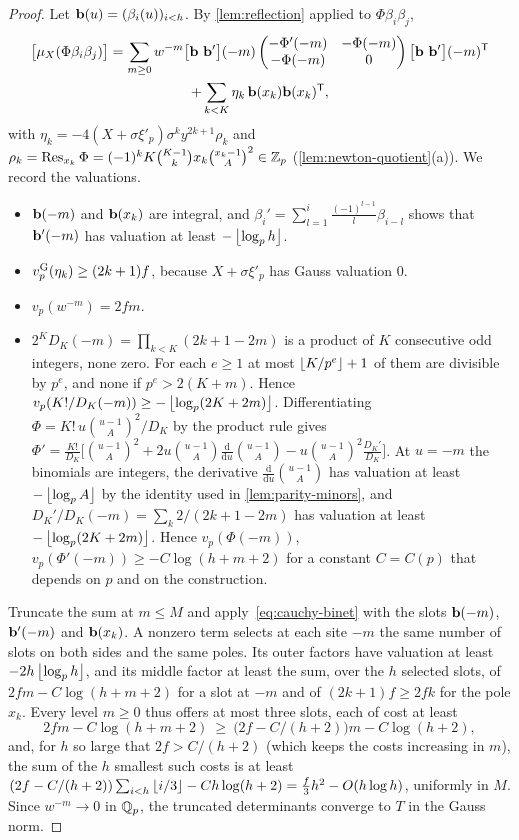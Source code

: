 \begin{proof}
Let $\mathbf{b}(u)=(\beta_i(u))_{i<h}$. By \cref{lem:reflection} applied to $\Phi\beta_i\beta_j$,
\begin{multline*}
  \bigl[\mu_X(\Phi\beta_i\beta_j)\bigr]=\sum_{m\ge0}w^{-m}\bigl[\bvec\ \bvec'\bigr](-m)
  \begin{pmatrix}-\Phi'(-m)&-\Phi(-m)\\-\Phi(-m)&0\end{pmatrix}
  \bigl[\bvec\ \bvec'\bigr](-m)^{\mathsf T}\\
  +\sum_{k<K}\eta_k\,\bvec(x_k)\bvec(x_k)^{\mathsf T},
\end{multline*}
with $\eta_k=-4(X+\sigma\xi'_p)\sigma^ky^{2k+1}\rho_k$ and
$\rho_k=\operatorname*{Res}_{x_k}\Phi=(-1)^kK\binom{K-1}kx_k\binom{x_k-1}{A}^2\in\mathbb{Z}_p$
(\cref{lem:newton-quotient}(a)). We record the valuations.
\begin{itemize}
\item $\mathbf{b}(-m)$ and $\mathbf{b}(x_k)$ are integral, and $\beta_i'=\sum_{l=1}^{i}\frac{(-1)^{l-1}}{l}
\beta_{i-l}$ shows that $\mathbf{b}'(-m)$ has valuation at least $-\left\lfloor \log_ph\right\rfloor$.
\item $v_{p}^{\mathrm{G}}(\eta_k)\ge(2k+1)f$, because $X+\sigma\xi'_p$ has Gauss valuation $0$.
\item $v_p(w^{-m})=2fm$.
\item $2^KD_K(-m)=\prod_{k<K}(2k+1-2m)$ is a product of $K$ consecutive odd integers, none zero.
For each $e\ge1$ at most $\left\lfloor K/p^e\right\rfloor+1$ of them are divisible by $p^e$, and none if
$p^e>2(K+m)$. Hence $v_p(K!/D_K(-m))\ge-\left\lfloor \log_p(2K+2m)\right\rfloor$. Differentiating
$\Phi=K!\,u\binom{u-1}A^2/D_K$ by the product rule gives
$\Phi'=\frac{K!}{D_K}\bigl[\binom{u-1}A^2+2u\binom{u-1}A\frac{\mathrm d}{\mathrm du}\binom{u-1}A
-u\binom{u-1}A^2\frac{D_K'}{D_K}\bigr]$. At $u=-m$ the binomials are integers, the derivative
$\frac{\mathrm d}{\mathrm du}\binom{u-1}A$ has valuation at least $-\left\lfloor \log_pA\right\rfloor$ by the
identity used in \cref{lem:parity-minors}, and
$D_K'/D_K(-m)=\sum_k2/(2k+1-2m)$ has valuation at least $-\left\lfloor \log_p(2K+2m)\right\rfloor$. Hence
$v_p(\Phi(-m))$, $v_p(\Phi'(-m))\ge-C\log(h+m+2)$ for a constant $C=C(p)$ that depends on $p$
and on the construction.
\end{itemize}
Truncate the sum at $m\le M$ and apply~\eqref{eq:cauchy-binet} with the slots $\mathbf{b}(-m)$,
$\mathbf{b}'(-m)$ and $\mathbf{b}(x_k)$. A nonzero term selects at each site $-m$ the same number of slots
on both sides and the same poles. Its outer factors have valuation at least $-2h\left\lfloor \log_ph\right\rfloor$,
and its middle factor at least the sum, over the $h$ selected slots, of $2fm-C\log(h+m+2)$ for a
slot at $-m$ and of $(2k+1)f\ge2fk$ for the pole $x_k$. Every level $m\ge0$ thus offers at most
three slots, each of cost at least
\[
  2fm-C\log(h+m+2)\ \ge\ \bigl(2f-C/(h+2)\bigr)m-C\log(h+2),
\]
and, for $h$ so large that $2f>C/(h+2)$ (which keeps the costs increasing in $m$), the sum of
the $h$ smallest such costs is at least
$(2f-C/(h+2))\sum_{i<h}\left\lfloor i/3\right\rfloor-Ch\log(h+2)=\frac f3h^2-O(h\log h)$, uniformly in $M$. Since
$w^{-m}\to0$ in $\mathbb{Q}_p$, the truncated determinants converge to $T$ in the Gauss norm.
\end{proof}

